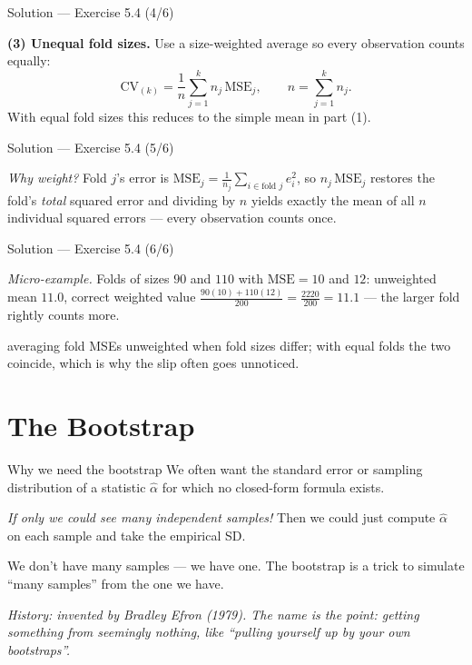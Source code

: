 \documentclass[aspectratio=169,11pt]{beamer}
\begin{document}
\begin{frame}{Solution --- Exercise 5.4 (4/6)}
  \begin{solutionbox}
    \textbf{(3) Unequal fold sizes.}
    Use a size-weighted average so every observation counts equally:
    \[
      \mathrm{CV}_{(k)} = \frac{1}{n}\sum_{j=1}^{k} n_j\,\mathrm{MSE}_j ,
      \qquad n = \sum_{j=1}^k n_j .
    \]
    With equal fold sizes this reduces to the simple mean in part (1).
  \end{solutionbox}
\end{frame}

\begin{frame}{Solution --- Exercise 5.4 (5/6)}
  \begin{solutionbox}
    \emph{Why weight?} Fold $j$'s error is
    $\mathrm{MSE}_j = \tfrac{1}{n_j}\sum_{i \in \text{fold } j} e_i^2$,
    so $n_j\,\mathrm{MSE}_j$ restores the fold's \emph{total} squared
    error and dividing by $n$ yields exactly the mean of all $n$
    individual squared errors --- every observation counts once.
  \end{solutionbox}
\end{frame}

\begin{frame}{Solution --- Exercise 5.4 (6/6)}
  \begin{solutionbox}
    \emph{Micro-example.} Folds of sizes $90$ and $110$ with
    $\mathrm{MSE} = 10$ and $12$: unweighted mean $11.0$, correct
    weighted value $\tfrac{90(10) + 110(12)}{200} = \tfrac{2220}{200}
    = 11.1$ --- the larger fold rightly counts more.
  \end{solutionbox}
  \begin{mistake}
    averaging fold MSEs unweighted when fold
    sizes differ; with equal folds the two coincide, which is why the
    slip often goes unnoticed.
  \end{mistake}
\end{frame}




\section{The Bootstrap}

\begin{frame}{Why we need the bootstrap}
  We often want the standard error or sampling distribution of a
  statistic $\hat\alpha$ for which no closed-form formula exists.
  \begin{takeaway}
    \emph{If only we could see many independent samples!} Then we
    could just compute $\hat\alpha$ on each sample and take the
    empirical SD.
  \end{takeaway}
  We don't have many samples --- we have one. The bootstrap is a
  trick to simulate ``many samples'' from the one we have.
  \par{\tiny\itshape\color{gray}History: invented by Bradley Efron
  (1979). The name is the point: getting something from seemingly nothing,
  like ``pulling yourself up by your own bootstraps''.}
\end{frame}
\end{document}
